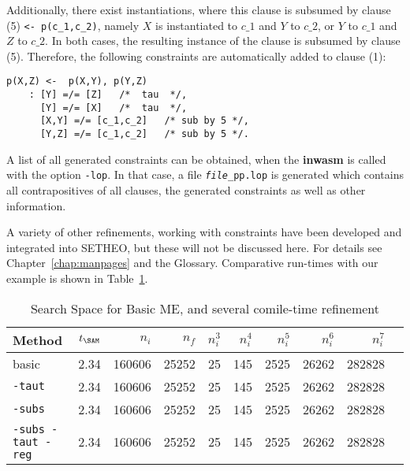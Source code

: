 Additionally, there exist instantiations, where this clause is subsumed
by clause (5) {\verb+<- p(c_1,c_2)+}, namely $X$ is instantiated
to $c\_1$ and $Y$ to $c\_2$, or $Y$ to $c\_1$ and $Z$ to $c\_2$.
In both cases, the resulting instance of the clause is subsumed by
clause (5).
Therefore, the following constraints are automatically added to
clause (1):

\begin{center}
\begin{verbatim}
p(X,Z) <-  p(X,Y), p(Y,Z)
	: [Y] =/= [Z]	/*  tau  */, 
	  [Y] =/= [X]	/*  tau  */, 
	  [X,Y] =/= [c_1,c_2]	/* sub by 5 */, 
	  [Y,Z] =/= [c_1,c_2]	/* sub by 5 */.
\end{verbatim}
\end{center}

A list of all generated constraints can be obtained, when the {\bf inwasm}
is called with the option {\tt -lop}. In that case, a file 
{\tt {\em file}\_pp.lop} is generated which contains all contrapositives
of all clauses, the generated constraints as well as other information.

A variety of other refinements, working with constraints have been
developed and integrated into SETHEO, but these will not be discussed
here. For details see Chapter~\ref{chap:manpages} and the Glossary.
Comparative run-times with our example is shown in 
Table~\ref{tab:tut2:results.constr}.

\begin{table}[htb]
\begin{center}
\begin{tabular}{|l|r|r||r|r||r|r|r|r|r|}
\hline
Method & $t_{\SAM}$ & $n_i$ & $n_f$ & 
	$n_i^3$ & $n_i^4$ & $n_i^5$ & $n_i^6$ & $n_i^7$ \\
\hline\hline
basic & 2.34 & 160606 & 25252 &
	25 & 145 & 2525 & 26262 & 282828 \\
\hline
{\tt -taut} & 2.34 & 160606 & 25252 &
	25 & 145 & 2525 & 26262 & 282828 \\
\hline
{\tt -subs} & 2.34 & 160606 & 25252 &
	25 & 145 & 2525 & 26262 & 282828 \\
\hline
{\tt -subs -taut -reg} & 2.34 & 160606 & 25252 &
	25 & 145 & 2525 & 26262 & 282828 \\
\hline\hline
\end{tabular}
\end{center}
\caption{Search Space for Basic ME, and several comile-time
refinement}
\label{tab:tut2:results.constr}
\end{table}

